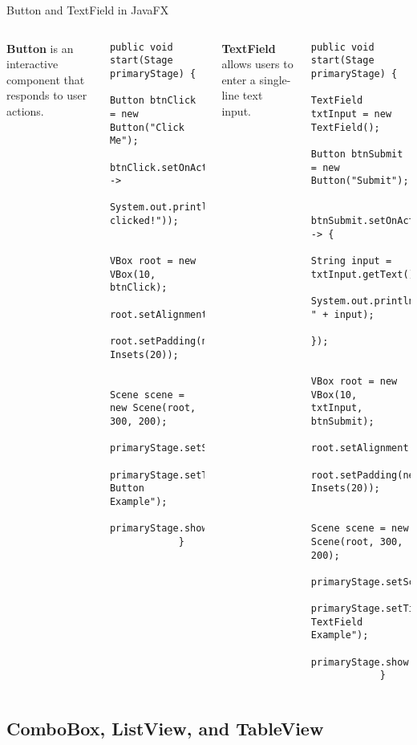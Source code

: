 \documentclass[aspectratio=169, table]{beamer}
\begin{document}
\begin{frame}[fragile]{Button and TextField in JavaFX}
	\vspace{10pt}
	\begin{columns}[t]
		\textbf{Button} is an interactive component that responds to user actions.
		\begin{lstlisting}[style=JavaStyle]
			public void start(Stage primaryStage) {
				Button btnClick = new Button("Click Me");
				btnClick.setOnAction(e -> 
				System.out.println("Button clicked!"));
				
				VBox root = new VBox(10, btnClick);
				root.setAlignment(Pos.CENTER);
				root.setPadding(new Insets(20));
				
				Scene scene = new Scene(root, 300, 200);
				primaryStage.setScene(scene);
				primaryStage.setTitle("JavaFX Button Example");
				primaryStage.show();
			}
		\end{lstlisting}
		
		\textbf{TextField} allows users to enter a single-line text input.
		\begin{lstlisting}[style=JavaStyle]
			public void start(Stage primaryStage) {
				TextField txtInput = new TextField();
				Button btnSubmit = new Button("Submit");
				
				btnSubmit.setOnAction(e -> {
					String input = txtInput.getText();
					System.out.println("Input: " + input);
				});
				
				VBox root = new VBox(10, txtInput, btnSubmit);
				root.setAlignment(Pos.CENTER);
				root.setPadding(new Insets(20));
				
				Scene scene = new Scene(root, 300, 200);
				primaryStage.setScene(scene);
				primaryStage.setTitle("JavaFX TextField Example");
				primaryStage.show();
			}
		\end{lstlisting}
	\end{columns}
\end{frame}


\subsection{ComboBox, ListView, and TableView}
\end{document}
